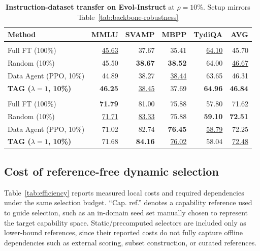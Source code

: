 \begin{table}[t]
\centering
\caption{\textbf{Instruction-dataset transfer on Evol-Instruct} at $\rho{=}10\%$.  Setup mirrors Table~\ref{tab:backbone-robustness}}
\label{tab:dataset-transfer}
{\fontsize{8pt}{12pt}\selectfont
\setlength{\tabcolsep}{3pt}
\begin{tabularx}{\columnwidth}{@{}Yrrrrr@{}}
\toprule
Method & MMLU & SVAMP & MBPP & TydiQA & AVG \\
\midrule
{}
 \\
Full FT (100\%)        & \underline{45.63} & 37.67 & 35.41 & \underline{64.10} & 45.70 \\
Random (10\%)          & 45.50 & \textbf{38.67} & \textbf{38.52} & 64.00 & \underline{46.67} \\
Data Agent (PPO, 10\%) & 44.89 & 38.27 & \underline{38.44} & 63.65 & 46.31 \\
\textbf{\textsc{TAG} ($\lambda{=}1$, 10\%)} & \textbf{46.25} & \underline{38.45} & 37.69 & \textbf{64.96} & \textbf{46.84} \\
\addlinespace[3pt]
 \\
Full FT (100\%)        & \textbf{71.79} & 81.00 & 75.88 & 57.80 & 71.62 \\
Random (10\%)          & \underline{71.71} & \underline{83.33} & 75.88 & \textbf{59.10} & \textbf{72.51} \\
Data Agent (PPO, 10\%) & 71.02 & 82.74 & \textbf{76.45} & \underline{58.79} & 72.25 \\
\textbf{\textsc{TAG} ($\lambda{=}1$, 10\%)} & 71.68 & \textbf{84.16} & \underline{76.02} & 58.04 & \underline{72.48} \\
    \bottomrule
\end{tabularx}
}
\end{table}

\subsection{Cost of reference-free dynamic selection}
\label{sec:cost}
Table~\ref{tab:efficiency} reports measured local costs and required
dependencies under the same selection budget. ``Cap. ref.'' denotes
a capability reference used to guide selection, such as an in-domain
seed set manually chosen to represent the target capability space.
Static/precomputed selectors are included only as lower-bound
references, since their reported costs do not fully capture offline
dependencies such as external scoring, subset construction, or
curated references.


